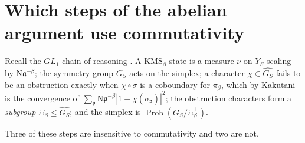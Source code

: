\documentclass[11pt]{amsart}
\numberwithin{equation}{section}
\theoremstyle{definition}
\theoremstyle{remark}
\newcommand{\pp}{\mathfrak{p}}
\newcommand{\aaa}{\mathfrak{a}}
\newcommand{\Ns}{\mathrm{N}}
\newcommand{\Prob}{\operatorname{Prob}}
\begin{document}
\begin{abstract}
\emph{What is not proved here.} We do not construct a $GL_n$ algebra whose
$\mathrm{KMS}_\beta$ simplex is $\Prob(G/N_\beta)$, and we explain precisely which step of
the $GL_1$ proof has no available substitute. Two concrete findings bear on the $GL_2$ case,
formulated for the Sato--Tate classes of a non-CM elliptic curve. If the classes along $S$
are Sato--Tate equidistributed then $\Xi_\beta(\rho,S)\sim4\sum_{\pp\in S}\Ns\pp^{-\beta}$
diverges whenever the partition function does, so \emph{no} symmetry breaking arises from a
Sato--Tate representation. Conversely, assuming Sato--Tate as an equidistribution input, we
construct sparse $S$ with $\zeta_S(1)=\infty$ and $\Xi_1(\rho,S)<\infty$ for the
representation attached to a non-CM elliptic curve, by selecting blocks of primes with
$\theta_p\le2^{-j}$; the exotic phase is therefore available, but only on deliberately
constructed anomalous sets, never generically.
\end{abstract}

\maketitle

\tableofcontents

\section{Which steps of the abelian argument use commutativity}

Recall the $GL_1$ chain of reasoning \cite{Main}. A $\mathrm{KMS}_\beta$ state is a measure
$\nu$ on $Y_S$ scaling by $\Ns\aaa^{-\beta}$; the symmetry group $G_S$ acts on the simplex;
a character $\chi\in\widehat{G_S}$ fails to be an obstruction exactly when $\chi\circ\sigma$
is a coboundary for $\pi_\beta$, which by Kakutani is the convergence of
$\sum_\pp\Ns\pp^{-\beta}|1-\chi(\sigma_\pp)|^2$; the obstruction characters form a
\emph{subgroup} $\Xi_\beta\le\widehat{G_S}$; and the simplex is
$\Prob(G_S/\Xi_\beta^\perp)$.

Three of these steps are insensitive to commutativity and two are not.
\end{document}
